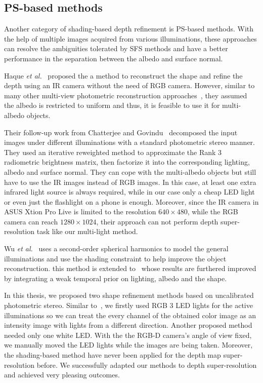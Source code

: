 \subsection{PS-based methods}
Another category of shading-based depth refinement is PS-based methods.
With the help of multiple images acquired from various illuminations, these approaches can resolve the ambiguities tolerated by SFS methods and have a better performance in the separation between the albedo and surface normal.

Haque \emph{et al.}~\cite{haque2014high} proposed the a method to reconstruct the shape and refine the depth using an IR camera without the need of RGB camera.
However, similar to many other multi-view photometric reconstruction approaches~\cite{park2013multiview, queau2017dense}, they assumed the albedo is restricted to uniform and thus, it is feasible to use it for multi-albedo objects.

Their follow-up work from Chatterjee and Govindu~\cite{chatterjee2015photometric} decomposed the input images under different illuminations with a standard photometric stereo manner.
They used an iterative reweighted method to approximate the Rank 3 radiometric brightness matrix, then factorize it into the corresponding lighting, albedo and surface normal. 
They can cope with the multi-albedo objects but still have to use the IR images instead of RGB images. 
In this case, at least one extra infrared light source is always required, while in our case only a cheap LED light or even just the flashlight on a phone is enough.
Moreover, since the IR camera in ASUS Xtion Pro Live is limited to the resolution $640\times 480$, while the RGB camera can reach $1280\times 1024$, their approach can not perform depth super-resolution task like our multi-light method.

Wu \emph{et al.}~\cite{wu2011high} uses a second-order spherical harmonics to model the general illuminations and use the shading constraint to help improve the object reconstruction.
this method is extended to~\cite{wu2011shading} whose results are furthered improved by integrating a weak temporal prior on lighting, albedo and the shape.


In this thesis, we proposed two shape refinement methods based on uncalibrated photometric stereo.
Similar to~\cite{hernandez2011overcoming}, we firstly used RGB 3 LED lights for the active illuminations so we can treat  the every channel of the obtained color image as an intensity image with lights from a different direction.
Another proposed method needed only one white LED. 
With the the RGB-D camera's angle of view fixed, we manually moved the LED lights while the images are being taken.
Moreover, the shading-based method have never been applied for the depth map super-resolution before.
We successfully adapted our methods to depth super-resolution and achieved very pleasing outcomes. 
